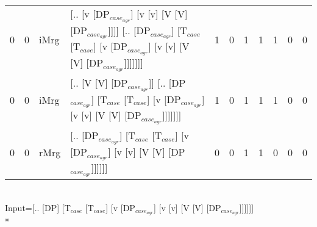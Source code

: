 \begin{tabularx}{\linewidth}{rrlXrrrrrrr}
   0 &   0 & iMrg & [.. [v [DP$_{case_{agr}}$] [v [v] [V [V] [DP$_{case_{agr}}$]]]] [.. [DP$_{case_{agr}}$] [T$_{case}$ [T$_{case}$] [v [DP$_{case_{agr}}$] [v [v] [V [V] [DP$_{case_{agr}}$]]]]]]]                   &            1 &              0 &             1 &             1 &                  1 &                0 &              0 \\
   0 &   0 & iMrg & [.. [V [V] [DP$_{case_{agr}}$]] [.. [DP$_{case_{agr}}$] [T$_{case}$ [T$_{case}$] [v [DP$_{case_{agr}}$] [v [v] [V [V] [DP$_{case_{agr}}$]]]]]]]                                             &            1 &              0 &             1 &             1 &                  1 &                0 &              0 \\
   0 &   0 & rMrg & [.. [DP$_{case_{agr}}$] [T$_{case}$ [T$_{case}$] [v [DP$_{case_{agr}}$] [v [v] [V [V] [DP$_{case_{agr}}$]]]]]]                                                                        &            0 &              0 &             1 &             1 &                  0 &                0 &              0 \\
\hline
\end{tabularx}\endgroup\\
\begingroup\scriptsize Input=[.. [DP] [T$_{case}$ [T$_{case}$] [v [DP$_{case_{agr}}$] [v [v] [V [V] [DP$_{case_{agr}}$]]]]]]\\*
